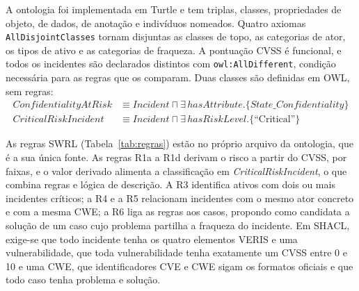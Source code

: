 \documentclass[12pt]{article}
\newcommand{\oc}[1]{\texttt{#1}}
\begin{document}
A ontologia foi implementada em Turtle e tem \vSevenTriples{} triplas, \vSevenClasses{} classes, \vSevenObjProps{} propriedades de objeto, \vSevenDataProps{} de dados, \vSevenAnnProps{} de anotação e \vSevenIndividuals{} indivíduos nomeados. Quatro axiomas \oc{AllDisjointClasses} tornam disjuntas as classes de topo, as categorias de ator, os tipos de ativo e as categorias de fraqueza. A pontuação CVSS é funcional, e todos os incidentes são declarados distintos com \oc{owl:AllDifferent}, condição necessária para as regras que os comparam. Duas classes são definidas em OWL, sem regras:
\begin{align*}
\mathit{ConfidentialityAtRisk} &\equiv \mathit{Incident} \sqcap \exists\,\mathit{hasAttribute}.\{\mathit{State\_Confidentiality}\}\\
\mathit{CriticalRiskIncident} &\equiv \mathit{Incident} \sqcap \exists\,\mathit{hasRiskLevel}.\{\text{``Critical''}\}
\end{align*}

As regras SWRL (Tabela~\ref{tab:regras}) estão no próprio arquivo da ontologia, que é a sua única fonte. As regras R1a a R1d derivam o risco a partir do CVSS, por faixas, e o valor derivado alimenta a classificação em \emph{CriticalRiskIncident}, o que combina regras e lógica de descrição. A R3 identifica ativos com dois ou mais incidentes críticos; a R4 e a R5 relacionam incidentes com o mesmo ator concreto e com a mesma CWE; a R6 liga as regras aos casos, propondo como candidata a solução de um caso cujo problema partilha a fraqueza do incidente. Em SHACL, exige-se que todo incidente tenha os quatro elementos VERIS e uma vulnerabilidade, que toda vulnerabilidade tenha exatamente um CVSS entre 0 e 10 e uma CWE, que identificadores CVE e CWE sigam os formatos oficiais e que todo caso tenha problema e solução.
\end{document}

